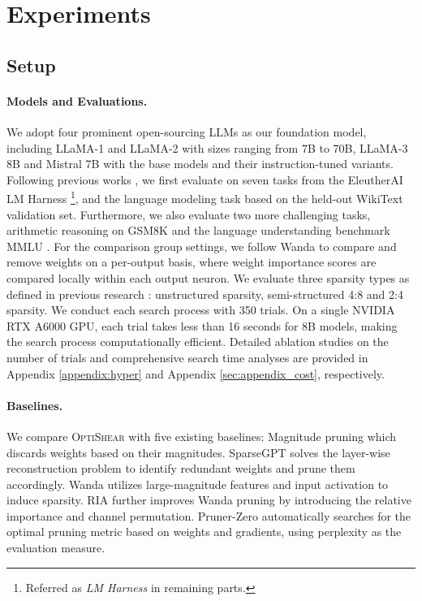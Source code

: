 \section{Experiments}
\label{sec:experiments}

\subsection{Setup}

\paragraph{Models and Evaluations.}
We adopt four prominent open-sourcing LLMs as our foundation model, including LLaMA-1 \citep{touvron2023llama} and LLaMA-2 \citep{touvron2023llama2} with sizes ranging from 7B to 70B, LLaMA-3 8B \citep{llama3} and Mistral 7B \citep{jiang2023mistral} with the base models and their instruction-tuned variants.
Following previous works \citep{sun2023simple,xia2023sheared}, we first evaluate on seven tasks from the EleutherAI LM Harness \citep{eval-harness}\footnote{Referred as \textit{LM Harness} in remaining parts.}, and the language modeling task based on the held-out WikiText \citep{merity2016pointer} validation set. Furthermore, we also evaluate two more challenging tasks, arithmetic reasoning on GSM8K \citep{cobbe2021training} and the language understanding benchmark MMLU \citep{hendrycks2020measuring}.
For the comparison group settings, 
we follow Wanda \citep{sun2023simple} to compare and remove weights on a per-output basis, where weight importance scores are compared locally within each output neuron. 
We evaluate three sparsity types as defined in previous research \citep{sun2023simple, zhangplug}: unstructured sparsity, semi-structured 4:8 and 2:4 sparsity.
We conduct each search process with 350 trials. On a single NVIDIA RTX A6000 GPU, each trial takes less than 16 seconds for 8B models, making the search process computationally efficient. Detailed ablation studies on the number of trials and comprehensive search time analyses are provided in Appendix \ref{appendix:hyper} and Appendix \ref{sec:appendix_cost}, respectively.


\vspace{-5mm}
\paragraph{Baselines.}
We compare \textsc{OptiShear} with five existing baselines:
Magnitude pruning \citep{han2015learning} which discards weights based on their magnitudes. SparseGPT \citep{frantar2023sparsegpt} solves the layer-wise reconstruction problem to identify redundant weights and prune them accordingly. Wanda \citep{sun2023simple} utilizes large-magnitude features and input activation to induce sparsity. RIA \citep{zhangplug} further improves Wanda pruning by introducing the relative importance and channel permutation. Pruner-Zero \citep{dongpruner} automatically searches for the optimal pruning metric based on weights and gradients, using perplexity as the evaluation measure.


